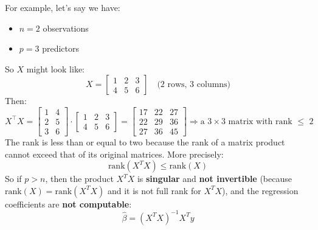 \highspace
For example, let's say we have:
\begin{itemize}
    \item $n = 2$ observations
    \item $p = 3$ predictors
\end{itemize}
So $X$ might look like:
\begin{equation*}
    X = \begin{bmatrix}
        1 & 2 & 3 \\
        4 & 5 & 6
    \end{bmatrix} \quad \text{(2 rows, 3 columns)}
\end{equation*}
Then:
\begin{equation*}
    X^\top X = \begin{bmatrix}
        1 & 4 \\
        2 & 5 \\
        3 & 6
    \end{bmatrix} \cdot \begin{bmatrix}
        1 & 2 & 3 \\
        4 & 5 & 6
    \end{bmatrix} = \begin{bmatrix}
        17 & 22 & 27 \\
        22 & 29 & 36 \\
        27 & 36 & 45
    \end{bmatrix} \Rightarrow \text{a 3$\times$3 matrix with rank $\le$ 2}
\end{equation*}
The rank is less than or equal to two because the rank of a matrix product cannot exceed that of its original matrices. More precisely:
\begin{equation*}
    \text{rank}\left(X^{T} X\right) \leq \text{rank}(X)
\end{equation*}
So if $p > n$, then the product $X^{T} X$ is \textbf{singular} and \textbf{not invertible} (because $\text{rank}(X) = \text{rank}\left(X^{T} X\right)$ and it is not full rank for $X^{T} X$), and the regression coefficients are \textbf{not computable}:
\begin{equation*}
    \hat{\beta} = \left(X^{T} X\right)^{-1}X^{T} y
\end{equation*}

\newpage

